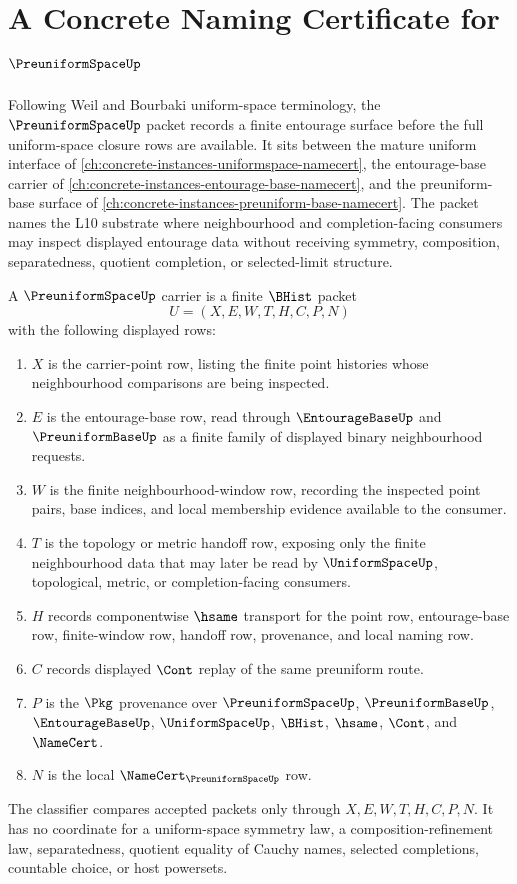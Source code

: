 \chapter{A Concrete Naming Certificate for $\PreuniformSpaceUp$}
\label{ch:concrete-instances-preuniform-space-namecert}

Following Weil and Bourbaki uniform-space terminology, the $\PreuniformSpaceUp$ packet records a finite entourage surface before the full uniform-space closure rows are available. It sits between the mature uniform interface of \autoref{ch:concrete-instances-uniformspace-namecert}, the entourage-base carrier of \autoref{ch:concrete-instances-entourage-base-namecert}, and the preuniform-base surface of \autoref{ch:concrete-instances-preuniform-base-namecert}. The packet names the L10 substrate where neighbourhood and completion-facing consumers may inspect displayed entourage data without receiving symmetry, composition, separatedness, quotient completion, or selected-limit structure.

\begin{definition}
\label{def:preuniform-space-carrier}
A $\PreuniformSpaceUp$ carrier is a finite $\BHist$ packet
$$
U=(X,E,W,T,H,C,P,N)
$$
with the following displayed rows:
\begin{enumerate}
\item $X$ is the carrier-point row, listing the finite point histories whose neighbourhood comparisons are being inspected.
\item $E$ is the entourage-base row, read through $\EntourageBaseUp$ and $\PreuniformBaseUp$ as a finite family of displayed binary neighbourhood requests.
\item $W$ is the finite neighbourhood-window row, recording the inspected point pairs, base indices, and local membership evidence available to the consumer.
\item $T$ is the topology or metric handoff row, exposing only the finite neighbourhood data that may later be read by $\UniformSpaceUp$, topological, metric, or completion-facing consumers.
\item $H$ records componentwise $\hsame$ transport for the point row, entourage-base row, finite-window row, handoff row, provenance, and local naming row.
\item $C$ records displayed $\Cont$ replay of the same preuniform route.
\item $P$ is the $\Pkg$ provenance over $\PreuniformSpaceUp$, $\PreuniformBaseUp$, $\EntourageBaseUp$, $\UniformSpaceUp$, $\BHist$, $\hsame$, $\Cont$, and $\NameCert$.
\item $N$ is the local $\NameCert_{\PreuniformSpaceUp}$ row.
\end{enumerate}
The classifier compares accepted packets only through $X,E,W,T,H,C,P,N$. It has no coordinate for a uniform-space symmetry law, a composition-refinement law, separatedness, quotient equality of Cauchy names, selected completions, countable choice, or host powersets.
\end{definition}

